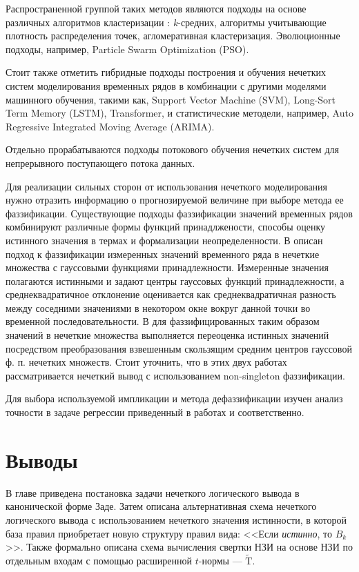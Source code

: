 Распространенной группой таких методов являются подходы на основе различных алгоритмов кластеризации \cite{Lucas2021}:  \textit{k}-средних, алгоритмы учитывающие плотность распределения точек, агломеративная кластеризация. Эволюционные подходы, например, Particle Swarm Optimization (PSO).

Стоит также отметить гибридные подходы построения и обучения нечетких систем моделирования временных рядов в комбинации с другими моделями машинного обучения, такими как, Support Vector Machine (SVM), Long-Sort Term Memory (LSTM), Transformer, и статистические методели, например, Auto Regressive Integrated Moving Average (ARIMA).

Отдельно прорабатываются подходы потокового обучения нечетких систем\cite{Lima2010, Alves2021} для непрерывного поступающего потока данных.

Для реализации сильных сторон от использования нечеткого моделирования нужно отразить информацию о прогнозируемой величине при выборе метода ее фаззификации. Существующие подходы фаззификации значений временных рядов комбинируют различные формы функций принадлжености, способы оценку истинного значения в термах и формализации неопределенности. В \cite{Pekaslan2020} описан подход к фаззификации измеренных значений временного ряда в нечеткие множества с гауссовыми  функциями принадлежности. Измеренные значения полагаются истинными и задают центры гауссовых функций принадлежности, а среднеквадратичное отклонение оценивается как среднеквадратичная разность между соседними значениями в некотором окне вокруг данной точки во временной последовательности.  В \cite{Pourabdollah2017} для фаззифицированных таким образом значений в нечеткие множества выполняется переоценка истинных значений посредством преобразования взвешенным скользящим средним центров гауссовой ф. п. нечетких множеств.  Стоит уточнить, что в этих двух работах рассматривается нечеткий вывод с использованием non-singleton фаззификации.

Для выбора используемой импликации и метода дефаззификации изучен анализ точности в задаче регрессии приведенный в работах \cite{Kiszka1985} и \cite{} соответственно.


\section{Выводы}

В главе приведена постановка задачи нечеткого логического вывода в канонической форме Заде. Затем описана альтернативная схема нечеткого логического вывода с использованием нечеткого значения истинности, в которой база правил приобретает новую структуру правил вида: <<Если \textit{истинно}, то $B_k$>>. Также формально описана схема вычисления свертки НЗИ на основе НЗИ по отдельным входам с помощью расширенной $t$-нормы --- $\tilde{\mathrm{T}}$.

